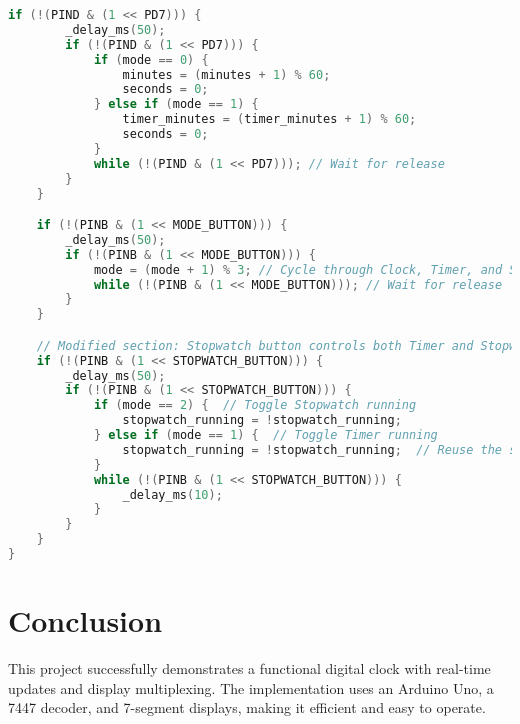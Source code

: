 \documentclass[a4paper,12pt]{article}
\begin{document}
\begin{lstlisting}[language=C++, caption=Arduino Code for Digital Clock]
    if (!(PIND & (1 << PD7))) {
        _delay_ms(50);
        if (!(PIND & (1 << PD7))) {
            if (mode == 0) {
                minutes = (minutes + 1) % 60;
                seconds = 0;
            } else if (mode == 1) {
                timer_minutes = (timer_minutes + 1) % 60;
                seconds = 0;
            }
            while (!(PIND & (1 << PD7))); // Wait for release
        }
    }

    if (!(PINB & (1 << MODE_BUTTON))) {
        _delay_ms(50);
        if (!(PINB & (1 << MODE_BUTTON))) {
            mode = (mode + 1) % 3; // Cycle through Clock, Timer, and Stopwatch
            while (!(PINB & (1 << MODE_BUTTON))); // Wait for release
        }
    }

    // Modified section: Stopwatch button controls both Timer and Stopwatch
    if (!(PINB & (1 << STOPWATCH_BUTTON))) {
        _delay_ms(50);
        if (!(PINB & (1 << STOPWATCH_BUTTON))) {
            if (mode == 2) {  // Toggle Stopwatch running
                stopwatch_running = !stopwatch_running;
            } else if (mode == 1) {  // Toggle Timer running
                stopwatch_running = !stopwatch_running;  // Reuse the same flag
            }
            while (!(PINB & (1 << STOPWATCH_BUTTON))) {
                _delay_ms(10);
            }
        }
    }
}
\end{lstlisting}

\section{Conclusion}
This project successfully demonstrates a functional digital clock with real-time updates and display multiplexing. The implementation uses an Arduino Uno, a 7447 decoder, and 7-segment displays, making it efficient and easy to operate.
\end{document}
